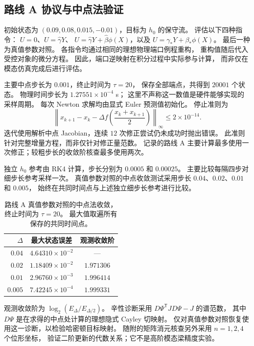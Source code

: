 \subsection{路线 A 协议与中点法验证}
\label{sx:route-a}
初始状态为 $(0.09,0.08,0.015,-0.01)$，目标为 $h_0$ 的保守流。
评估以下四种指令：
$U=0$、$U=\widehat\gamma Y$、
$U=\widehat\gamma Y+\widehat\beta\phi(X)$，以及
$U=\gamma_*Y+\beta_*\phi(X)$。
最后一种为真值参数对照。
各指令均通过相同的理想物理端口例程重构，
重构值随后代入受控对象的微分方程。
因此，端口逆映射在积分过程中实际参与计算，
而非仅在模态仿真完成后进行评估。

主要中点步长为 $0.001$，终止时间为 $\tau=20$，
保存全部端点，共得到 $20001$ 个状态。
物理时间步长为 $1.27551\times10^{-4}$ s；
这里不声称这一数值是硬件能够实现的采样周期。
每次 Newton 求解均由显式 Euler 预测值初始化。
停止准则为
\begin{equation}
 \left\|x_{k+1}-x_k-
 \Delta f\!\left(\frac{x_k+x_{k+1}}2\right)\right\|_\infty
 \leq2\times10^{-14}.
 \label{sx:newton-stop}
\end{equation}
迭代使用解析中点 Jacobian，连续 $12$ 次修正尝试仍未成功时抛出错误。
此准则针对完整增量方程，而非仅针对修正量范数。
记录的路线 A 主要计算最多使用一次修正；较粗步长的收敛阶核查最多使用两次。

独立 $h_0$ 参考由 RK4 计算，步长分别为 $0.0005$ 和 $0.00025$。
主要比较每隔四步对细步长参考采样一次。
真值参数对照的中点收敛测试采用步长 $0.04$、$0.02$、$0.01$ 和 $0.005$，
始终在共同时间点与上述独立细步长参考进行比较。

\begin{table}[t]
\centering
\caption{路线 A 真值参数对照的中点法收敛，终止时间为 $\tau=20$。
最大值取遍所有保存的共同时间点。}
\label{sx:order-table}
\setlength{\tabcolsep}{4pt}
\begin{tabular}{rcc}
\toprule
$\Delta$ & 最大状态误差 & 观测收敛阶\\
\midrule
$0.04$ & $4.64310\times10^{-2}$ & --- \\
$0.02$ & $1.18409\times10^{-2}$ & $1.971306$ \\
$0.01$ & $2.96760\times10^{-3}$ & $1.996414$ \\
$0.005$ & $7.42245\times10^{-4}$ & $1.999331$ \\
\bottomrule
\end{tabular}
\end{table}

观测收敛阶为 $\log_2(E_\Delta/E_{\Delta/2})$。
辛性诊断采用 $D\Psi^{\mathsf T}JD\Psi-J$ 的谱范数，
其中 $D\Psi$ 是在求得的中点处计算的理想隐式 Cayley 切映射。
仅对真值参数对照恢复使用这一诊断，以检验哈密顿目标映射。
随附的矩阵消元核查另外采用 $n=1,2,4$ 个位形坐标，
验证二阶更新的代数关系；它不是高阶模态梁精度实验。


